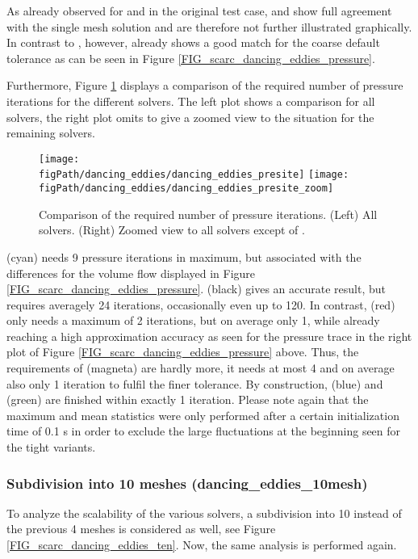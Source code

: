 \newpage
As already observed for \ffttight{} and \uglmat{} in the original test case, \scarctight{} and \uscarc{} show full agreement with the single mesh solution and are therefore not further illustrated graphically.
In contrast to \fftdefault{}, however, \scarcdefault{} already shows a good match for the coarse default tolerance as can be seen in Figure \ref{FIG_scarc_dancing_eddies_pressure}. 

Furthermore, Figure \ref{FIG_scarc_dancing_eddies_presite} displays a comparison of the required number of pressure iterations for the different solvers. The left plot shows a comparison for all solvers, the right plot omits \ffttight{} to give a zoomed view to the situation for the remaining solvers. 

\begin{figure}[ht]
\begin{center}
\texttt{[image: \\figPath/dancing\_eddies/dancing\_eddies\_presite]}
\texttt{[image: \\figPath/dancing\_eddies/dancing\_eddies\_presite\_zoom]}
\end{center}
\caption[Results of different \scarc{} variants for the  {} test cases]{Comparison of the required number of pressure iterations. (Left) All solvers. (Right) Zoomed view to all solvers except of \ffttight{}.}
\label{FIG_scarc_dancing_eddies_presite}
\end{figure}

\fftdefault{} (cyan) needs 9 pressure iterations in maximum, but associated with the differences for the volume flow displayed in Figure \ref{FIG_scarc_dancing_eddies_pressure}. \ffttight{} (black) gives an accurate result, but requires averagely 24 iterations, occasionally even up to 120. 
In contrast, \scarcdefault{} (red) only needs a maximum of 2 iterations, but on average only 1, while already reaching a high approximation accuracy as seen for the pressure trace in the right plot of Figure \ref{FIG_scarc_dancing_eddies_pressure} above.
Thus, the requirements of \scarctight{} (magneta) are hardly more, it needs at most 4 and on average also only 1 iteration
to fulfil the finer tolerance.
By construction, \uglmat{} (blue) and \uscarc{} (green) are finished within exactly 1 iteration.
Please note again that the maximum and mean statistics were only performed after a certain initialization time of 0.1 s in order to exclude the large fluctuations at the beginning seen for the tight variants.

\subsubsection{Subdivision into 10 meshes ({\ct dancing\_eddies\_10mesh})}
To analyze the scalability of the various solvers, a subdivision into 10 instead of the previous 4 meshes is considered as well, see Figure \ref{FIG_scarc_dancing_eddies_ten}. Now, the same analysis is performed again.

